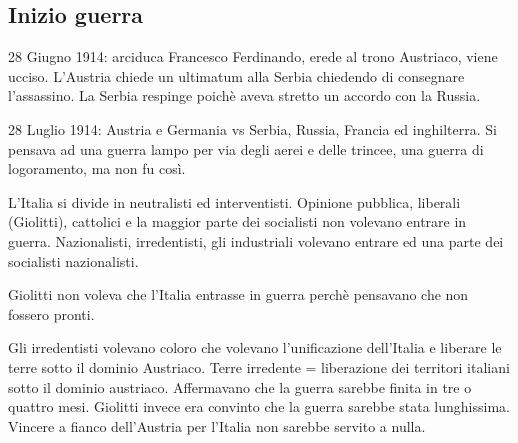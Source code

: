 \documentclass{article}
\begin{document}
    \subsection{Inizio guerra}
    28 Giugno 1914: arciduca Francesco Ferdinando, erede al trono Austriaco, viene ucciso.
    L'Austria chiede un ultimatum alla Serbia chiedendo di consegnare l'assassino. La Serbia respinge poichè aveva stretto
    un accordo con la Russia.

    28 Luglio 1914: Austria e Germania vs Serbia, Russia, Francia ed inghilterra.
    Si pensava ad una guerra lampo per via degli aerei e delle trincee, una guerra di logoramento, ma non fu così.

    L'Italia si divide in neutralisti ed interventisti.
    Opinione pubblica, liberali (Giolitti), cattolici e la maggior parte dei socialisti non volevano entrare in guerra.
    Nazionalisti, irredentisti, gli industriali volevano entrare ed una parte dei socialisti nazionalisti.

    Giolitti non voleva che l'Italia entrasse in guerra perchè pensavano che non fossero pronti.

    Gli irredentisti volevano coloro che volevano l'unificazione dell'Italia e liberare le terre sotto il dominio Austriaco.
    Terre irredente = liberazione dei territori italiani sotto il dominio austriaco.
    Affermavano che la guerra sarebbe finita in tre o quattro mesi.
    Giolitti invece era convinto che la guerra sarebbe stata lunghissima.
    Vincere a fianco dell'Austria per l'Italia non sarebbe servito a nulla.
\end{document}
